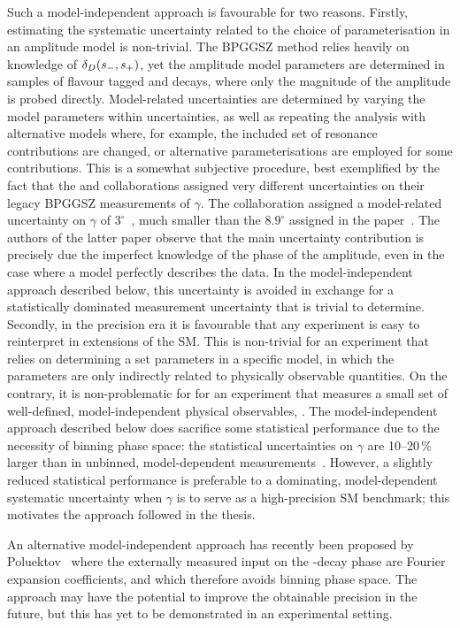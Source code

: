 Such a model-independent approach is favourable for two reasons. Firstly, estimating the systematic uncertainty related to the choice of parameterisation in an amplitude model is non-trivial. The BPGGSZ method relies heavily on knowledge of $\delta_D(s_-, s_+)$, yet the amplitude model parameters are determined in samples of flavour tagged \Dz and \Dzb decays, where only the magnitude of the amplitude is probed directly. Model-related uncertainties are determined by varying the model parameters within uncertainties, as well as repeating the analysis with alternative models where, for example, the included set of resonance contributions are changed, or alternative parameterisations are employed for some contributions. This is a somewhat subjective procedure, best exemplified by the fact that the \babar and \belle collaborations assigned very different uncertainties on their legacy BPGGSZ measurements of $\gamma$. The \babar collaboration assigned a model-related uncertainty on $\gamma$ of $3^\circ$~\cite{BABAR2010}, much smaller than the $8.9^\circ$ assigned in the \belle paper~\cite{BELLE2010}. The authors of the latter paper observe that the main uncertainty contribution is precisely due the imperfect knowledge of the phase of the amplitude, even in the case where a model perfectly describes the data. In the model-independent approach described below, this uncertainty is avoided in exchange for a statistically dominated measurement uncertainty that is trivial to determine. 
Secondly, in the precision era it is favourable that any experiment is easy to reinterpret in  extensions of the SM. This is non-trivial for an experiment that relies on determining a set parameters in a specific  model, in which the parameters are only indirectly related to physically observable quantities. On the contrary, it is non-problematic for for an experiment that measures a small set of well-defined, model-independent physical observables, . The model-independent approach described below does sacrifice some statistical performance due to the necessity of binning phase space: the statistical uncertainties on $\gamma$ are 10--20\,\% larger than in unbinned, model-dependent measurements~\cite{bondarUseQuantumcorrelatedD02008}. However, a slightly reduced statistical performance is preferable to a dominating, model-dependent systematic uncertainty when $\gamma$ is to serve as a high-precision SM benchmark; this motivates the approach followed in the thesis.

An alternative model-independent approach has recently been proposed by Poluektov~\cite{poluektovUnbinnedModelindependentMeasurements2018} where the externally measured input on the \D-decay phase are Fourier expansion coefficients, and which therefore avoids binning phase space. The approach may have the potential to improve the obtainable precision in the future, but this has yet to be demonstrated in an experimental setting.


